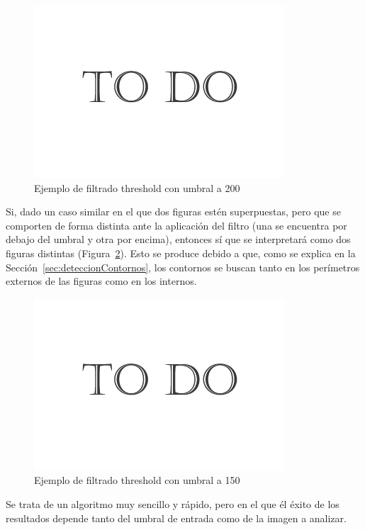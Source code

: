 {		\begin{figure}[htbp]
		\centering
		\hspace*{-0.3in}
		\includegraphics[scale=0.47]{graphics/todo.png}
		\caption{Ejemplo de filtrado threshold con umbral a 200}
		\label{fig:threshold1}
		\end{figure}
		
	Si, dado un caso similar en el que dos figuras estén superpuestas, pero que se comporten de forma distinta ante la aplicación del filtro (una se encuentra por debajo del umbral y otra por encima), entonces sí que se interpretará como dos figuras distintas (Figura~\ref{fig:threshold2}). Esto se produce debido a que, como se explica en la Sección~\ref{sec:deteccionContornos}, los contornos se buscan tanto en los perímetros externos de las figuras como en los internos.
	
		\begin{figure}[htbp]
		\centering
		\hspace*{-0.3in}
		\includegraphics[scale=0.47]{graphics/todo.png}
		\caption{Ejemplo de filtrado threshold con umbral a 150}
		\label{fig:threshold2}
		\end{figure}
		
	Se trata de un algoritmo muy sencillo y rápido, pero en el que él éxito de los resultados depende tanto del umbral de entrada como de la imagen a analizar.
		
}
